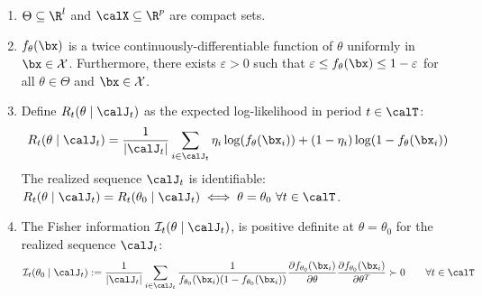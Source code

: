 \documentclass[blindrev]{informs3noheader}
\begin{document}
\begin{stat}[Regularity]\label{ass:regularity}
\begin{enumerate}
    \item $\Theta\subseteq\R^{l}$ and $\calX\subseteq\R^{p}$ are compact sets. 
    \item $f_\theta(\bx)$ is a twice continuously-differentiable function of $\theta$ uniformly in $\bx \in \mathcal{X}$. Furthermore, there exists $\varepsilon>0$ such that $\varepsilon \leq f_\theta(\bx) \leq 1-\varepsilon$ for all $\theta \in \Theta$ and $\bx \in \mathcal{X}$.
    \item Define $R_t(\theta\mid \calJ_t)$ as the expected log-likelihood in period $t\in\calT$: \[R_t(\theta \mid \calJ_t)=\frac{1}{|\calJ_t|}\sum_{i \in \calJ_t}\eta_i\log(f_\theta(\bx_{i}))+(1-\eta_i)\log(1-f_\theta(\bx_{i}))\]
    The realized sequence $\calJ_t$ is identifiable: $R_t(\theta \mid \calJ_t)=R_t(\theta_0\mid \calJ_t) \iff \theta = \theta_0\ \forall t\in\calT$.
    \item The Fisher information $\mathcal{I}_t(\theta \mid \calJ_t)$, is positive definite at $\theta=\theta_0$ for the realized sequence $\calJ_t$:
        \[\mathcal{I}_t(\theta_0\mid \calJ_t) := \frac{1}{|\calJ_t|} \sum_{i \in \calJ_t}\frac{1}{f_{\theta_0}(\bx_i)(1-f_{\theta_0}(\bx_i))}\frac{\partial f_{\theta_0}(\bx_i)}{\partial \theta}\frac{\partial f_{\theta_0}(\bx_i)}{\partial \theta^T} \succ 0 \qquad \forall t\in\calT\]
\end{enumerate}
\end{stat}    
\end{document}
